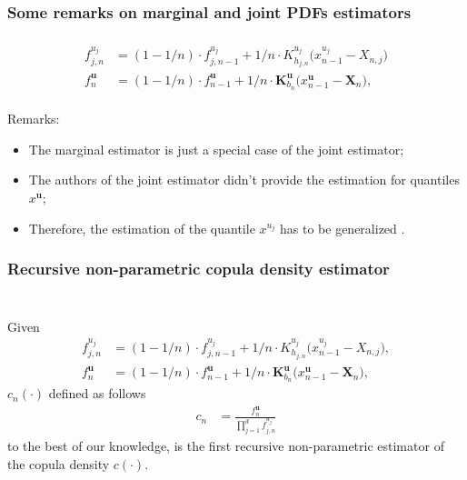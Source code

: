 \documentclass[aspectratio=169]{beamer}
\begin{document}
			
		\subsubsection{Some remarks on marginal and joint PDFs estimators}
			\begin{frame}
				\frametitle{\insertsubsubsection}
				
				\begin{align}
					f^{u_j}_{j, n} &= (1- 1/n) \cdot f^{u_j}_{j, n-1} + 1/n \cdot K^{u_j}_{h_{j, n}}\big(x^{u_j}_{n-1} - X_{n, j}\big) \\
					f^{\mathbf{u}}_n &= (1- 1/n) \cdot f^{\mathbf{u}}_{n-1} + 1/n \cdot \mathbf{K}_{b_n}^{\mathbf{u}} \big(x_{n-1}^{\mathbf{u}} - \mathbf{X}_n\big),
				\end{align}\\[1em]
				
				Remarks:
				\begin{itemize}
					\item<2-> The marginal estimator is just a special case of the joint estimator;
					\item<2-> The authors of the joint estimator didn't provide the estimation for quantiles $ x^{\mathbf{u}} $;
					\item<2-> Therefore, the estimation of the quantile $ x^{u_j} $ has to be generalized .
				\end{itemize}
				
			\end{frame}
			
		\subsubsection{Recursive non-parametric copula density estimator}
			\begin{frame}
				\frametitle{\insertsubsubsection}
				~\\
				Given
				\begin{align}
					f^{u_j}_{j, n} &= (1- 1/n) \cdot f^{u_j}_{j, n-1} + 1/n \cdot K^{u_j}_{h_{j, n}}\big(x^{u_j}_{n-1} - X_{n, j}\big), \\
					f^{\mathbf{u}}_n &= (1- 1/n) \cdot f^{\mathbf{u}}_{n-1} + 1/n \cdot \mathbf{K}_{b_n}^{\mathbf{u}} \big(x_{n-1}^{\mathbf{u}} - \mathbf{X}_n\big),
				\end{align}
				$ c_n(\cdot) $ defined as follows
				\begin{align}
					c_n &= \frac{f^{\mathbf{u}}_n}{\prod_{j=1}^{d}f^{u_j}_{j, n}}
				\end{align}
				to the best of our knowledge, is the first recursive non-parametric estimator of the copula density $ c(\cdot) $.
				
			\end{frame}
	
\end{document}
